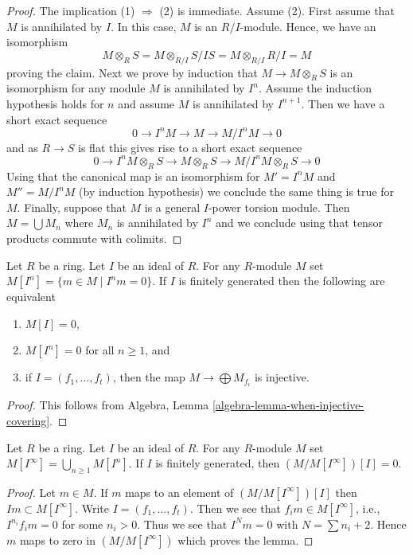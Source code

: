 \begin{proof}
The implication (1) $\Rightarrow$ (2) is immediate.
Assume (2). First assume that $M$ is annihilated by $I$.
In this case, $M$ is an $R/I$-module. Hence, we have an isomorphism
$$
M \otimes_R S = M \otimes_{R/I} S/IS = M \otimes_{R/I} R/I = M
$$
proving the claim. Next we prove by induction that $M \to M \otimes_R S$
is an isomorphism for any module $M$ is annihilated by $I^n$. Assume
the induction hypothesis holds for $n$ and assume $M$ is annihilated by
$I^{n + 1}$. Then we have a short exact sequence
$$
0 \to I^nM \to M \to M/I^nM \to 0
$$
and as $R \to S$ is flat this gives rise to a short exact sequence
$$
0 \to I^nM \otimes_R S \to M \otimes_R S \to M/I^nM \otimes_R S \to 0
$$
Using that the canonical map is an isomorphism for $M' = I^nM$ and
$M'' = M/I^nM$ (by induction hypothesis) we conclude the same thing is
true for $M$. Finally, suppose that $M$ is a general $I$-power torsion
module. Then $M = \bigcup M_n$ where $M_n$ is annihilated by $I^n$
and we conclude using that tensor products commute with colimits.
\end{proof}

\begin{lemma}
\label{lemma-torsion-free}
Let $R$ be a ring. Let $I$ be an ideal of $R$.
For any $R$-module $M$ set $M[I^n] = \{m \in M \mid I^nm = 0\}$.
If $I$ is finitely generated then the following are equivalent
\begin{enumerate}
\item $M[I] = 0$,
\item $M[I^n] = 0$ for all $n \geq 1$, and
\item if $I = (f_1, \ldots, f_t)$, then the map
$M \to \bigoplus M_{f_i}$ is injective.
\end{enumerate}
\end{lemma}

\begin{proof}
This follows from
Algebra, Lemma \ref{algebra-lemma-when-injective-covering}.
\end{proof}

\begin{lemma}
\label{lemma-divide-by-torsion}
Let $R$ be a ring. Let $I$ be an ideal of $R$. For any $R$-module $M$
set $M[I^\infty] = \bigcup_{n \geq 1} M[I^n]$.
If $I$ is finitely generated, then $(M/M[I^\infty])[I] = 0$.
\end{lemma}

\begin{proof}
Let $m \in M$. If $m$ maps to an element of $(M/M[I^\infty])[I]$
then $Im \subset M[I^\infty]$.
Write $I = (f_1, \ldots, f_t)$. Then we see that
$f_i m \in M[I^\infty]$, i.e., $I^{n_i}f_i m = 0$ for some $n_i > 0$.
Thus we see that $I^Nm = 0$ with $N = \sum n_i + 2$.
Hence $m$ maps to zero in $(M/M[I^\infty])$ which proves the lemma.
\end{proof}

